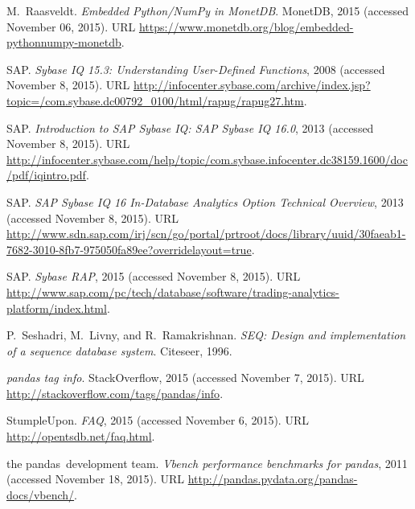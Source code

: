 \documentclass{acm_proc_article-sp}
\begin{document}
\begin{thebibliography}{28}
M.~Raasveldt.
\newblock \emph{Embedded Python/NumPy in MonetDB}.
\newblock MonetDB, 2015 (accessed November 06, 2015).
\newblock URL \url{https://www.monetdb.org/blog/embedded-pythonnumpy-monetdb}.

SAP.
\newblock \emph{Sybase IQ 15.3: Understanding User-Defined Functions}, 2008
  (accessed November 8, 2015).
\newblock URL
  \url{http://infocenter.sybase.com/archive/index.jsp?topic=/com.sybase.dc00792\_0100/html/rapug/rapug27.htm}.

SAP.
\newblock \emph{Introduction to SAP Sybase IQ: SAP Sybase IQ 16.0}, 2013
  (accessed November 8, 2015){}.
\newblock URL
  \url{http://infocenter.sybase.com/help/topic/com.sybase.infocenter.dc38159.1600/doc/pdf/iqintro.pdf}.

SAP.
\newblock \emph{SAP Sybase IQ 16 In-Database Analytics Option Technical
  Overview}, 2013 (accessed November 8, 2015){}.
\newblock URL
  \url{http://www.sdn.sap.com/irj/scn/go/portal/prtroot/docs/library/uuid/30faeab1-7682-3010-8fb7-975050fa89ee?overridelayout=true}.

SAP.
\newblock \emph{Sybase RAP}, 2015 (accessed November 8, 2015).
\newblock URL
  \url{http://www.sap.com/pc/tech/database/software/trading-analytics-platform/index.html}.

P.~Seshadri, M.~Livny, and R.~Ramakrishnan.
\newblock \emph{SEQ: Design and implementation of a sequence database system}.
\newblock Citeseer, 1996.

\emph{pandas tag info}.
\newblock StackOverflow, 2015 (accessed November 7, 2015).
\newblock URL \url{http://stackoverflow.com/tags/pandas/info}.

StumpleUpon.
\newblock \emph{FAQ}, 2015 (accessed November 6, 2015).
\newblock URL \url{http://opentsdb.net/faq.html}.

the pandas~development team.
\newblock \emph{Vbench performance benchmarks for pandas}, 2011 (accessed
  November 18, 2015).
\newblock URL \url{http://pandas.pydata.org/pandas-docs/vbench/}.


\end{thebibliography}
\end{document}
